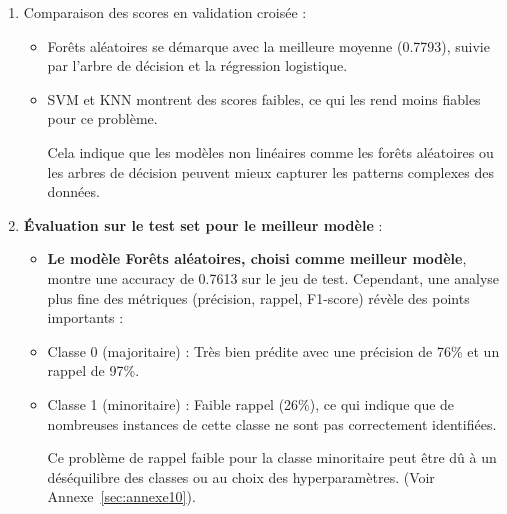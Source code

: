 \begin{flushleft}
\begin{enumerate}
\item Comparaison des scores en validation croisée :
\begin{itemize}
\item Forêts aléatoires se démarque avec la meilleure moyenne (0.7793), suivie par l'arbre de décision et la régression logistique.
\item SVM et KNN montrent des scores faibles, ce qui les rend moins fiables pour ce problème.

Cela indique que les modèles non linéaires comme les forêts aléatoires ou les arbres de décision peuvent mieux capturer les patterns complexes des données.
\end{itemize}

\item \textbf{Évaluation sur le test set pour le meilleur modèle} :
\begin{itemize}
\item \textbf{Le modèle Forêts aléatoires, choisi comme meilleur modèle}, montre une accuracy de 0.7613 sur le jeu de test. Cependant, une analyse plus fine des métriques (précision, rappel, F1-score) révèle des points importants :
\item Classe 0 (majoritaire) : Très bien prédite avec une précision de 76\% et un rappel de 97\%.
\item Classe 1 (minoritaire) : Faible rappel (26\%), ce qui indique que de nombreuses instances de cette classe ne sont pas correctement identifiées.

Ce problème de rappel faible pour la classe minoritaire peut être dû à un déséquilibre des classes ou au choix des hyperparamètres. (Voir Annexe~\ref{sec:annexe10}). 
\end{itemize}
\end{enumerate}
\end{flushleft} 

